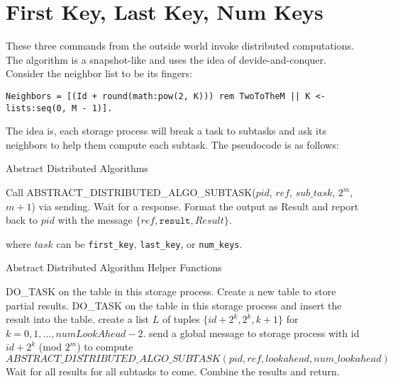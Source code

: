 \documentclass[11pt]{article}
\begin{document}
\section{First Key, Last Key, Num Keys}
These three commands from the outside world invoke distributed computations. The algorithm is a snapshot-like and uses the idea of devide-and-conquer. Consider the neighbor list to be its fingers:
  \begin{lstlisting}
Neighbors = [(Id + round(math:pow(2, K))) rem TwoToTheM || K <- lists:seq(0, M - 1)].
  \end{lstlisting}
The idea is, each storage process will break a task to subtasks and ask its neighbors to help them compute each subtask. The pseudocode is as follows:
\begin{algorithm}[H]
  \caption{Abstract Distributed Algorithms}\label{abstract_algo}
  \begin{algorithmic}[1]
       \State Call ABSTRACT\_DISTRIBUTED\_ALGO\_SUBTASK($pid$, $ref$, $sub\_task$, $2^m$, $m+ 1$) via sending.
       \State Wait for a response.
       \State Format the output as Result and report back to $pid$ with the message $\{ref, \texttt{result}, Result\}$.
   \EndFunction
  \end{algorithmic}
\end{algorithm}


\noindent where $task$ can be \texttt{first\_key}, \texttt{last\_key}, or \texttt{num\_keys}.

\begin{algorithm}[H]
  \caption{Abstract Distributed Algorithm Helper Functions}\label{abstract_algo}
  \begin{algorithmic}[1]
           \State DO\_TASK on the table in this storage process.
      \Else
       \State Create a new table to store partial results.
       \State DO\_TASK on the table in this storage process and insert the result into the table.
       \State create a list $L$ of tuples $\{id + 2^k, 2^k, k + 1\}$ for $k = 0, 1, \ldots, numLookAhead - 2.$
				\State send a global message to storage process with id $id + 2^k$ (mod $2^m$) to compute $ABSTRACT\_DISTRIBUTED\_ALGO\_SUBTASK(pid, ref, lookahead, num\_lookahead)$
			\EndFor
	    \State Wait for all results for all subtasks to come.
		\State Combine the results and return.
	  \EndIf
   \EndFunction
  \end{algorithmic}
\end{algorithm}
\end{document}
